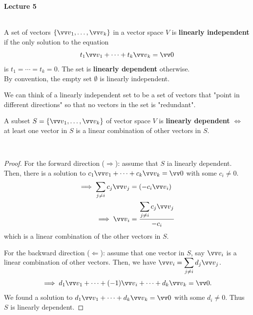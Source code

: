 \makebox[\linewidth]{\hrulefill}
{\large \textbf{Lecture 5}}

\begin{definition}
    \phantom{}  \\
    A set of vectors $\left\{\vvv_1, \ldots, \vvv_k\right\}$ in a vector space $V$ is \textbf{linearly independent}
    if the only solution to the equation
    \[t_1\vvv_1 + \cdots + t_k\vvv_k = \vzero\]
    is $t_1 = \cdots = t_k = 0$. The set is \textbf{linearly dependent} otherwise.  \\
    By convention, the empty set $\emptyset$ is linearly independent.
\end{definition}

\begin{remark}
    We can think of a linearly independent set to be a set of vectors that "point in different directions"
    so that no vectors in the set is "redundant". \\
\end{remark}

\begin{proposition}
    A subset $S = \{\vvv_1, \ldots, \vvv_k\}$ of vector space $V$ is \textbf{linearly dependent} $\iff$ at least
    one vector in $S$ is a linear combination of other vectors in $S$.
\end{proposition}

\phantom{}\

\begin{proof}
    For the forward direction ($\Rightarrow$): assume that $S$ ia linearly dependent.
    Then, there is a solution to $c_1\vvv_1 + \cdots + c_k\vvv_k = \vzero$ with some $c_i \neq 0$.
    \begin{align*}
        \implies \displaystyle \sum_{j \neq i} c_j\vvv_j &= (-c_i\vvv_i) \\
        \implies \vvv_i &= \frac{\displaystyle \sum_{j \neq i} c_j\vvv_j}{-c_i}
    \end{align*}
    which is a linear combination of the other vectors in $S$.

    For the backward direction ($\Leftarrow$): assume that one vector in $S$, say $\vvv_i$ is a linear combination of other vectors.
    Then, we have $\vvv_i = \displaystyle \sum_{j \neq i} d_j\vvv_j$.
    \[\implies d_1\vvv_1 + \cdots + (-1) \vvv_i + \cdots + d_k\vvv_k = \vzero.\]
    We found a solution to $d_1\vvv_1 + \cdots + d_k\vvv_k = \vzero$ with some $d_i \neq 0$. Thus $S$ is linearly dependent.
\end{proof}

